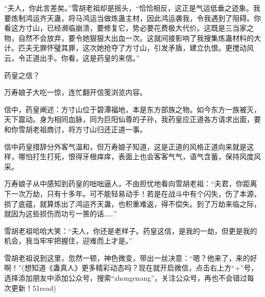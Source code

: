 \begin{this_body}
“夫人，你此言差矣。”雪胡老祖却是摇头，“恰恰相反，这正是气运低垂之迹象。我要炼制鸿运齐天蛊，将马鸿运当做炼蛊主材，因此鸿运袭我，令我遇到了阻碍。你看这方寸山，已经濒临崩溃，要修复它，势必要花费极大代价。这既是三当家之物，自然不会放弃，要令她狠狠大出血一次。这就间接影响了我搜集炼蛊材料的大计。匹夫无罪怀璧其罪，这次她抢夺了方寸山，引发矛盾，建立仇恨。更搅动风云，令正道出手。你看，这是药皇的来信。”

药皇之信？

万寿娘子大吃一惊，连忙翻开信笺浏览内容。

信中，药皇阐述：方寸山位于碧潭福地，本是东方部族之物。如今东方一族被灭，天下震动。身为相同血脉，同为巨阳仙尊的子孙，我药皇应正道各方请求出面，要和你雪胡老祖商讨，将方寸山归还正道一事。

信中药皇措辞分外客气温和，但万寿娘子知道，这是正道的风格正道向来就是这样，哪怕打生打死，恨得牙根痒痒，表面上也会客客气气，语气含蓄，保持风度风采。

万寿娘子从中感知到药皇的咄咄逼人，不由担忧地看向雪胡老祖：“夫君，你距离下一次万劫，只有十多年。可不能轻易动手！若是在战斗中有个闪失，伤了本源，损了底蕴，就算炼出了鸿运齐天蛊，也积重难返，得不偿失。到了万劫来临之际，就因为这些损伤而功亏一篑的话……”

雪胡老祖哈哈大笑：“夫人，你还是老样子。药皇这信，是我的一劫，但更是我的机会，我当牢牢把握住，迎难而上才是。”

雪胡老祖说到这里，忽然一顿，神色微变，带出一丝决意：“嗯？他来了，来的好啊！”(想知道《蛊真人》更多精彩动态吗？现在就开启微信，点击右上方“+”号，选择添加朋友中添加公众号，搜索“zhongenang”，关注公众号，再也不会错过每次更新！51read)

\end{this_body}

